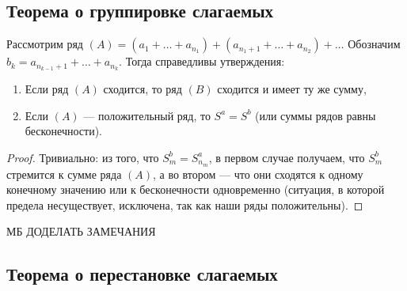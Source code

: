 \subsection{Теорема о группировке слагаемых}

\begin{theorem}
	Рассмотрим ряд \((A) = (a_1 + \ldots + a_{n_1}) + (a_{n_1+1} + \ldots + a_{n_2}) + \ldots\) Обозначим \(b_k = a_{n_{k-1}+1} + \ldots + a_{n_k}\).  Тогда справедливы утверждения:
	\begin{enumerate}
		\item Если ряд \((A)\) сходится, то ряд \((B)\) сходится и имеет ту же сумму,
		\item Если \((A)\) --- положительный ряд, то \(S^a = S^b\) (или суммы рядов равны бесконечности).
	\end{enumerate}
\end{theorem}
\begin{proof}
	Тривиально: из того, что \(S_m^b = S_{n_m}^a\), в первом случае получаем, что \(S_m^b\) стремится к сумме ряда \((A)\), а во втором --- что они сходятся к одному конечному значению или к бесконечности одновременно (ситуация, в которой предела несуществует, исключена, так как наши ряды положительны).
\end{proof}

МБ ДОДЕЛАТЬ ЗАМЕЧАНИЯ

\subsection{Теорема о перестановке слагаемых}


